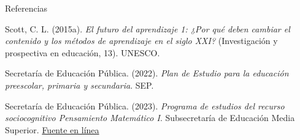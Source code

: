 \documentclass[
	spanish,
	aspectratio=1610,
	xcolor={dvipsnames,table}
]{beamer}
\begin{document}
\begin{frame}{Referencias}
\fontsize{9}{11}\selectfont\raggedright 
{\setlength{\parskip}{6pt}
\par\hangindent=1.27cm  Scott, C. L. (2015a). \textit{El futuro del aprendizaje 1: ¿Por qué deben cambiar el contenido y los métodos de aprendizaje en el siglo XXI?} (Investigación y prospectiva en educación, 13). UNESCO.
\par\hangindent=1.27cm  Secretaría de Educación Pública. (2022). \textit{Plan de Estudio para la educación preescolar, primaria y secundaria}. SEP.
\par\hangindent=1.27cm Secretaría de Educación Pública. (2023). \textit{Programa de estudios del recurso sociocognitivo Pensamiento Matemático I}. Subsecretaría de Educación Media Superior. \href{https://dgb.sep.gob.mx/storage/recursos/2025/09/nfhyrKiRiF-Pensamiento-Matematico-I.pdf}{Fuente en línea}
}


\end{frame}
\end{document}
